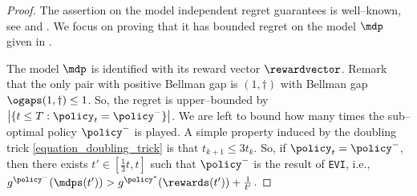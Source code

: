 \documentclass[preprint,cleveref,12pt]{colt2025}
\DeclarePairedDelimiter{\braces}{\{}{\}}	%
\DeclarePairedDelimiter{\abs}{\lvert}{\rvert}	%
\def\model{\mdp}
\def\models{\mdps}
\def\reward{\rewardvector}
\begin{document}
    \bigskip
    \def\proofname{Proof of \Cref{proposition_bounded_regret}}
    \begin{proof}
        The assertion on the model independent regret guarantees is well--known, see \cite{ortner_online_2010} and .
        We focus on proving that it has bounded regret on the model $\model$ given in .

        The model $\model$ is identified with its reward vector $\reward$. 
        Remark that the only pair with positive Bellman gap is $(1, \dagger)$ with Bellman gap $\ogaps(1, \dagger) \le 1$. 
        So, the regret is upper--bounded by $\abs*{\braces{t \le T : \policy_t = \policy^-}}$.
        We are left to bound how many times the sub--optimal policy $\policy^-$ is played. 
        A simple property induced by the doubling trick \eqref{equation_doubling_trick} is that $t_{k+1} \le 3t_k$. 
        So, if $\policy_t = \policy^-$, then there exists $t' \in [\frac 13 t, t]$ such that $\policy^-$ is the result of \texttt{EVI}, i.e., $g^{\policy^-}(\models({t'})) > g^{\policy^*}(\rewards({t'})) + \frac 1{t'}$. 


\end{proof}
\end{document}
